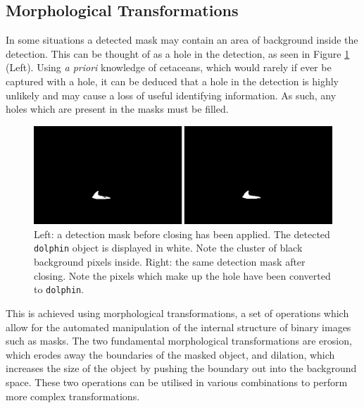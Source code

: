 \subsection{Morphological Transformations}\label{ch:cetDet,sec:postProcessing,sub:morphologicalTransformations}

In some situations a detected mask may contain an area of background inside the detection. This can be thought of as a hole in the detection, as seen in Figure \ref{fig:before-and-after-morphing-masks-only} (Left). Using \textit{a priori} knowledge of cetaceans, which would rarely if ever be captured with a hole, it can be deduced that a hole in the detection is highly unlikely and may cause a loss of useful identifying information. As such, any holes which are present in the masks must be filled.  

\begin{figure}
	\begin{center}
		\includegraphics[scale=0.5]{Chapter3/figs/before-and-after-morphing-masks-only.png}
	\end{center}
	\caption[Left: a detection mask before closing has been applied. Right: the same detection mask after closing.]{Left: a detection mask before closing has been applied. The detected \texttt{dolphin} object is displayed in white. Note the cluster of black background pixels inside. Right: the same detection mask after closing. Note the pixels which make up the hole have been converted to \texttt{dolphin}.}
	\label{fig:before-and-after-morphing-masks-only}
\end{figure}

This is achieved using morphological transformations, a set of operations which allow for the automated manipulation of the internal structure of binary images such as masks. The two fundamental morphological transformations are erosion, which erodes away the boundaries of the masked object, and dilation, which increases the size of the object by pushing the boundary out into the background space. These two operations can be utilised in various combinations to perform more complex transformations.

